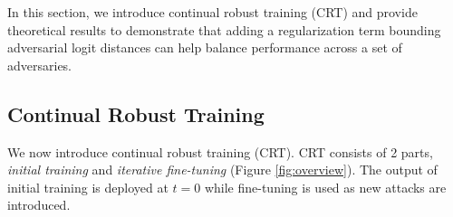 



In this section, we introduce continual robust training (CRT) and provide theoretical results to demonstrate that adding a regularization term bounding adversarial logit distances can help balance performance across a set of adversaries.
\subsection{Continual Robust Training}
We now introduce continual robust training (CRT).  CRT consists of 2 parts, \textit{initial training} and \textit{iterative fine-tuning} (Figure \ref{fig:overview}).  The output of initial training is deployed at $t=0$ while fine-tuning is used as new attacks are introduced.

